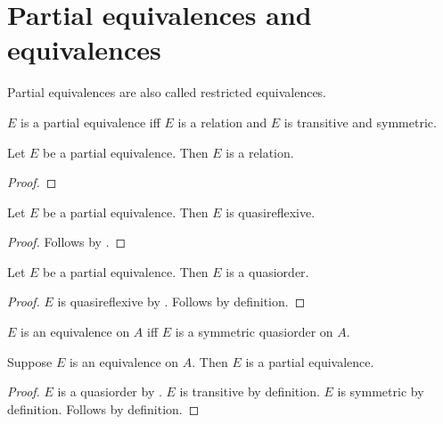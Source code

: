 





\section{Partial equivalences and equivalences}

Partial equivalences are also called restricted equivalences.

\begin{abbreviation}\label{partialequivalence}
    $E$ is a partial equivalence iff
    $E$ is a relation and $E$ is transitive and symmetric.
\end{abbreviation}

\begin{classification}\label{partialequivalence_is_relation}
    Let $E$ be a partial equivalence.
    Then $E$ is a relation.
\end{classification}
\begin{proof}
\end{proof}

\begin{proposition}\label{partialequivalence_is_quasireflexive}
    Let $E$ be a partial equivalence.
    Then $E$ is quasireflexive.
\end{proposition}
\begin{proof}
    Follows by .
\end{proof}

\begin{classification}\label{partialequivalence_is_quasiorder}
    Let $E$ be a partial equivalence.
    Then $E$ is a quasiorder.
\end{classification}
\begin{proof}
    $E$ is quasireflexive by .
    Follows by definition.
\end{proof}

\begin{abbreviation}\label{equivalence_on}
    $E$ is an equivalence on $A$ iff
    $E$ is a symmetric quasiorder on $A$.
\end{abbreviation}

\begin{proposition}\label{equivalence_on_implies_partialequivalence}
    Suppose $E$ is an equivalence on $A$.
    Then $E$ is a partial equivalence.
\end{proposition}
\begin{proof}
    $E$ is a quasiorder by .
    $E$ is transitive by definition.
    $E$ is symmetric by definition.
    Follows by definition.
\end{proof}

